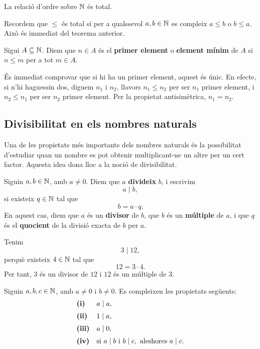 \begin{corollari}
La relació d'ordre sobre $\mathbb{N}$ és total.
\end{corollari}

\begin{prova}
Recordem que $\leq$ és total si per a qualssevol $a,b\in \mathbb{N}$ es compleix $a\leq b$ o $b\leq a$. Això és immediat del teorema anterior.
\end{prova}

\begin{definicio}
Sigui $A\subseteq \mathbb{N}$. Diem que $n\in A$ és el \textbf{primer element} o \textbf{element mínim} de $A$ si $n\leq m$ per a tot $m\in A$.
\end{definicio}

És immediat comprovar que si hi ha un primer element, aquest és únic. En efecte, si n'hi haguessin dos, diguem $n_1$ i $n_2$, llavors $n_1\leq n_2$ per ser $n_1$ primer element, i $n_2\leq n_1$ per ser $n_2$ primer element. Per la propietat antisimètrica, $n_1=n_2$.

\subsection{Divisibilitat en els nombres naturals}

Una de les propietats més importants dels nombres naturals és la possibilitat d'estudiar quan un nombre es pot obtenir multiplicant-ne un altre per un cert factor. Aquesta idea dona lloc a la noció de divisibilitat.

\begin{definicio}
Siguin $a,b\in\mathbb{N}$, amb $a\neq 0$. Diem que $a$ \textbf{divideix} $b$, i escrivim
\[
a\mid b,
\]
si existeix $q\in\mathbb{N}$ tal que
\[
b=a\cdot q.
\]
En aquest cas, diem que $a$ és un \textbf{divisor} de $b$, que $b$ és un \textbf{múltiple} de $a$, i que $q$ és el \textbf{quocient} de la divisió exacta de $b$ per $a$.
\end{definicio}

\begin{exemple}
Tenim
\[
3\mid 12,
\]
perquè existeix $4\in\mathbb{N}$ tal que
\[
12=3\cdot 4.
\]
Per tant, $3$ és un divisor de $12$ i $12$ és un múltiple de $3$.
\end{exemple}

\begin{proposicio}
Siguin $a,b,c\in\mathbb{N}$, amb $a\neq 0$ i $b\neq 0$. Es compleixen les propietats següents:
\[
\begin{array}{ll}
\text{\textbf{(i)}} & a\mid a,\\[2mm]
\text{\textbf{(ii)}} & 1\mid a,\\[2mm]
\text{\textbf{(iii)}} & a\mid 0,\\[2mm]
\text{\textbf{(iv)}} & \text{si } a\mid b \text{ i } b\mid c,\text{ aleshores } a\mid c.
\end{array}
\]
\end{proposicio}

